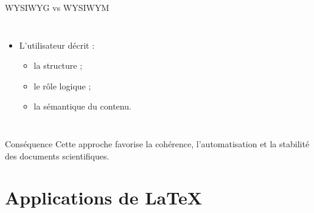 \documentclass[aspectratio=169]{beamer}
\begin{document}
\begin{frame}{WYSIWYG vs WYSIWYM}
\begin{columns}[T]
\begin{itemize}
				\vspace{0.2cm}
				
				\item L’utilisateur décrit :
				\begin{itemize}
					\item la structure ;
					\item le rôle logique ;
					\item la sémantique du contenu.
				\end{itemize}
			\end{itemize}
			
		\end{columns}
		
		\vspace{0.4cm}
		
		\begin{block}{Conséquence}
			Cette approche favorise la cohérence, l’automatisation et la stabilité des documents scientifiques.
		\end{block}
		
	\end{frame}
	
	
	\section{Applications de \LaTeX{}}
	
\end{document}
